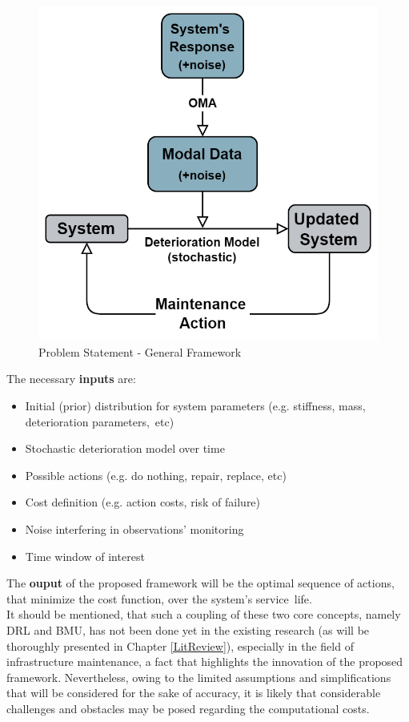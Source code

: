 \begin{figure}[H]
    \centering
	\includegraphics[width=0.5\linewidth]{Figures/basicFlow.png}
	\caption{Problem Statement - General Framework}
	\label{genProb}
\end{figure}

\newpage

The necessary \textbf{inputs} are:

\begin{itemize}
    \item Initial (prior) distribution for system parameters (e.g. stiffness, mass, deterioration parameters,~etc)
    \item Stochastic deterioration model over time
    \item Possible actions (e.g. do nothing, repair, replace, etc)
    \item Cost definition (e.g. action costs, risk of failure)
    \item Noise interfering in observations' monitoring
    \item Time window of interest
\end{itemize}

The \textbf{ouput} of the proposed framework will be the optimal sequence of actions, that minimize the cost function, over the system's service~life.\\

It should be mentioned, that such a coupling of these two core concepts, namely \gls{DRL} and \gls{BMU}, has not been done yet in the existing research (as will be thoroughly presented in Chapter \ref{LitReview}), especially in the field of infrastructure maintenance, a fact that highlights the innovation of the proposed framework. Nevertheless, owing to the limited assumptions and simplifications that will be considered for the sake of accuracy, it is likely that considerable challenges and obstacles may be posed regarding the computational costs.


